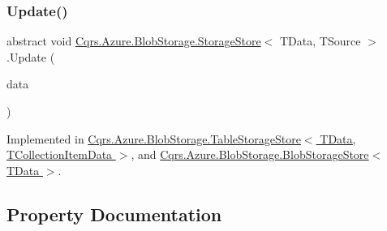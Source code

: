 \mbox{\label{classCqrs_1_1Azure_1_1BlobStorage_1_1StorageStore_ae9ca8bfe30040f77e349a4d47b31da70_ae9ca8bfe30040f77e349a4d47b31da70}} 
\subsubsection{\texorpdfstring{Update()}{Update()}}
{\footnotesize\ttfamily abstract void \hyperlink{classCqrs_1_1Azure_1_1BlobStorage_1_1StorageStore}{Cqrs.\+Azure.\+Blob\+Storage.\+Storage\+Store}$<$ T\+Data, T\+Source $>$.Update (\begin{DoxyParamCaption}\item[{T\+Data}]{data }\end{DoxyParamCaption})\hspace{0.3cm}{\ttfamily [pure virtual]}}



Implemented in \hyperlink{classCqrs_1_1Azure_1_1BlobStorage_1_1TableStorageStore_a869eba77358b10fc298f8e13fb21d628_a869eba77358b10fc298f8e13fb21d628}{Cqrs.\+Azure.\+Blob\+Storage.\+Table\+Storage\+Store$<$ T\+Data, T\+Collection\+Item\+Data $>$}, and \hyperlink{classCqrs_1_1Azure_1_1BlobStorage_1_1BlobStorageStore_a03be976aded454866b4589de99a9e1c8_a03be976aded454866b4589de99a9e1c8}{Cqrs.\+Azure.\+Blob\+Storage.\+Blob\+Storage\+Store$<$ T\+Data $>$}.



\subsection{Property Documentation}
\mbox{\label{classCqrs_1_1Azure_1_1BlobStorage_1_1StorageStore_ad16f8d276c7570c95979b39098d1216b_ad16f8d276c7570c95979b39098d1216b}} 
